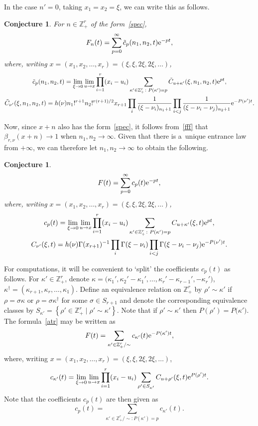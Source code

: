 \documentclass[pdftex]{sigma}
\newtheorem{conj}[thm]{Conjecture}
\theoremstyle{definition}
\newcommand\Z{{\mathbb Z}}
\begin{document}
In the case $n'=0$, taking $x_1=x_2=\xi$, we can write this as follows.

\begin{conj} For $n\in\Z_+^r$ of the form~\eqref{spec},
\begin{equation}\label{atr-n}
F_n(t)=\sum_{p=0}^\infty \tilde c_p(n_1,n_2,t) {\rm e}^{-pt},\end{equation}
where, writing $x=(x_1,x_2,\dots,x_r)=(\xi,\xi,2\xi,2\xi,\dots)$,
\begin{gather*}
 \tilde c_p(n_1,n_2,t)=
 \lim_{\xi\to 0}\lim_{u\to x} \prod_{i=1}^r(x_i-u_i)
\sum_{\kappa'\in\Z_+^r\colon P(\kappa')=p} \tilde C_{u+\kappa'}(\xi,n_1,n_2,t) {\rm e}^{pt},\\
\tilde C_{\nu'}(\xi,n_1,n_2,t)= h(\nu) n_1!^{r+1} n_2!^{r(r+1)/2} x_{r+1}
\prod_i \frac1{(\xi-\nu_i)_{n_1+1}} \prod_{ i<j}\frac1{(\xi-\nu_i-\nu_j)_{n_2+1}} {\rm e}^{-P(\nu') t}.
\end{gather*}
\end{conj}

Now, since $x+n$ also has the form~\eqref{spec}, it follows from~\eqref{fff} that $\beta_{r,\nu}(x+n)\to 1$
when $n_1,n_2\to \infty$. Given that there is a~unique entrance law from $+\infty$, we can therefore let
$n_1,n_2\to \infty$ to obtain the following.
\begin{conj}
\begin{equation}\label{atr}
F(t)=\sum_{p=0}^\infty c_p(t) {\rm e}^{-pt},\end{equation}
where, writing $x=(x_1,x_2,\dots,x_r)=(\xi,\xi,2\xi,2\xi,\dots)$,
\begin{gather*}
c_p(t)= \lim_{\xi\to 0}\lim_{u\to x} \prod_{i=1}^r(x_i-u_i)
\sum_{\kappa'\in\Z_+^r\colon P(\kappa')=p} C_{u+\kappa'}(\xi,t) {\rm e}^{pt},\\
C_{\nu'}(\xi,t)= h(\nu) \Gamma(x_{r+1})^{-1} \prod_i\Gamma(\xi-\nu_i) \prod_{ i<j}\Gamma(\xi-\nu_i-\nu_j) {\rm e}^{-P(\nu') t}.
\end{gather*}
\end{conj}

For computations, it will be convenient to `split' the coefficients $c_p(t)$ as follows.
For $\kappa'\in\Z_+^r$, denote
$\kappa=\big(\kappa_1',\kappa_2'-\kappa_1',\dots,\kappa_r'-\kappa_{r-1}',-\kappa_r'\big)$, $ \kappa^\dagger=(\kappa_{r+1},\kappa_r,\dots,\kappa_1)$.
Define an equivalence relation on $\Z_+^r$ by $\rho'\sim\kappa'$ if $\rho=\sigma\kappa$ or $\rho=\sigma\kappa^\dagger$
for some $\sigma\in S_{r+1}$ and denote the corresponding equivalence classes by
$S_{\kappa'}=\left\{\rho'\in\Z_+^r\mid \rho'\sim\kappa'\right\}$.
Note that if $\rho'\sim\kappa'$ then $P(\rho')=P\big(\kappa'\big)$.
The formula~\eqref{atr} may be written as
\begin{equation}\label{atr-ck} F(t)=\sum_{\kappa'\in \Z_+^r/{\sim}} c_{\kappa'}(t) {\rm e}^{-P(\kappa')t},\end{equation}
where, writing $x=(x_1,x_2,\dots,x_r)=(\xi,\xi,2\xi,2\xi,\dots)$,
\[c_{\kappa'}(t)= \lim_{\xi\to 0}\lim_{u\to x} \prod_{i=1}^r (x_i-u_i)
\sum_{\rho' \in S_{\kappa'}} C_{u+\rho'}(\xi,t) {\rm e}^{P(\rho')t}.\]
Note that the coefficients $c_p(t)$ are then given as
\[c_p(t)=\sum_{\kappa'\in \Z_+^r/{\sim}\colon P(\kappa')=p} c_{\kappa'}(t).\]
\end{document}
